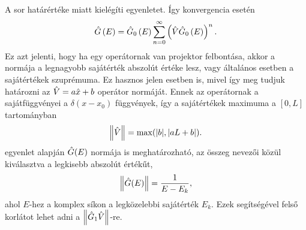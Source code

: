 A sor határértéke  miatt kielégíti  egyenletet. Így konvergencia esetén
\begin{equation}
	\hat{G}\left(E\right) = \hat{G}_0\left(E\right)\sum_{n=0}^\infty\left(\hat{V}\hat{G}_0\left(E\right)\right)^n.
	\label{perturbation:series}
\end{equation}
Ez azt jelenti, hogy ha egy operátornak van projektor felbontása, akkor a normája a legnagyobb sajátérték abszolút értéke lesz, vagy általános esetben a sajátértékek szuprémuma. Ez hasznos jelen esetben is, mivel így meg tudjuk határozni az $\hat{V}=a\hat{x}+b$ operátor normáját. Ennek az operátornak a sajátfüggvényei a $\delta(x-x_0)$ függvények, így a sajátértékek maximuma a $[0,L]$ tartományban
\begin{equation}
	\left\lVert \hat{V} \right\rVert=\max(\rvert b \lvert, \lvert aL+b\rvert).
\end{equation}
 egyenlet alapján $\hat{G}(E)$ normája is meghatározható, az összeg nevezői közül kiválasztva a legkisebb abszolút értékűt,
\begin{equation}
	\left\lVert \hat{G}(E) \right\rVert=\frac{1}{E-E_k},
\end{equation}
ahol $E$-hez a komplex síkon a legközelebbi sajátérték $E_k$. Ezek segítségével felső korlátot lehet adni a $\left\lVert \hat{G}_1\hat{V} \right\rVert$-re.

